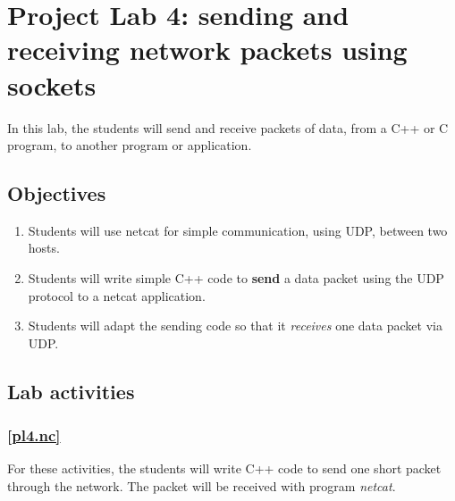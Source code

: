 \documentclass[12pt]{book}
\begin{document}

\chapter{Project Lab 4: sending and receiving network packets using sockets}

In this lab, the students will send and receive packets of data, from a C++ or C program, to another program or application.

\section{Objectives}

\begin{enumerate}[label=Objective \arabic*]
\item\label{pl4.nc} Students will use netcat for simple communication, using UDP, between two hosts.
\item\label{pl4.send} Students will write simple C++ code to \textbf{send} a data packet using the UDP protocol to a netcat application.
  \item\label{pl4.recv} Students will adapt the sending code so that it \emph{receives} one data packet via UDP.
\end{enumerate}


\section{Lab activities}

\subsection{\ref{pl4.nc}}

For these activities, the students will write C++ code to send one short packet through the network. The packet will be received with program \emph{netcat}. 
\end{document}
